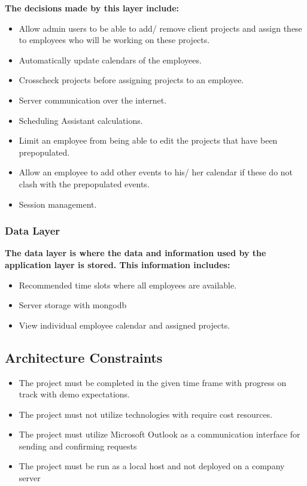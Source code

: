 \documentclass[a4paper,12pt]{article}
\begin{document}
    \textbf{The decisions made by this layer include:}
          \begin{itemize}
            \item Allow admin users to be able to add/ remove client projects and assign these to employees who will be working on these projects.
            \item Automatically update calendars of the employees.
            \item Crosscheck projects before assigning projects to an employee.
            \item Server communication over the internet.
            \item Scheduling Assistant calculations. 
            \item Limit an employee from being able to edit the projects that have been prepopulated.
            \item Allow an employee  to add other events to his/ her calendar if these do not clash with the prepopulated events.
            \item Session management.
          \end{itemize}
  
  \subsubsection{Data Layer}
    \textbf{The data layer is where the data and information used by the application layer is stored. This information includes:}
    \begin{itemize}
        \item Recommended time slots where all employees are available. 
        \item Server storage with mongodb
        \item View individual employee calendar and assigned projects. 
    \end{itemize}
    
\subsection{Architecture Constraints}
	\begin{itemize}
		\item The project must be completed in the given time frame with progress on        track with demo expectations.
		\item The project must not utilize technologies with require cost resources.
		\item The project must utilize Microsoft Outlook as a communication interface       for sending and confirming requests
		\item The project must be run as a local host and not deployed on a company         server
	\end{itemize}
    
\end{document}
